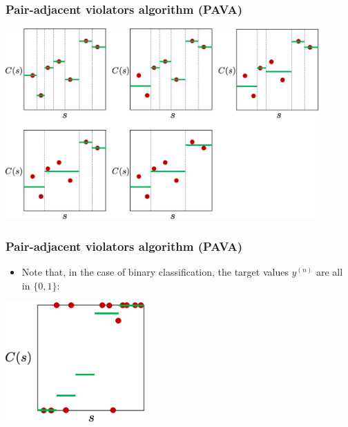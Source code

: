 \begin{frame}[t]
	\frametitle{Pair-adjacent violators algorithm (PAVA)}
	
	\medskip 
	
	\begin{center}
		\includegraphics[width=0.9\textwidth]{figure/pic-pava}
		
	\end{center}
\end{frame}

\begin{frame}[t]
	\frametitle{Pair-adjacent violators algorithm (PAVA)}
	
	\begin{itemize}
		\item Note that, in the case of binary classification, the target values $y^{(n)}$ are all in $\{ 0, 1 \}$:
	\end{itemize}
	
	\medskip 
	
	\begin{center}
		\includegraphics[width=0.4\textwidth]{figure/pic-pava2}
		
	\end{center}
\end{frame}


